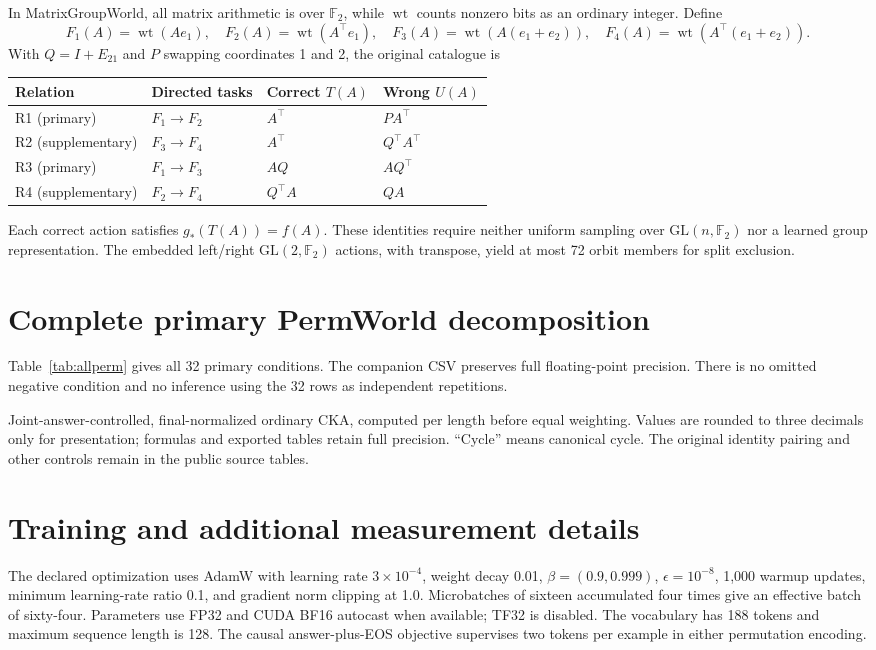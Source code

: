 \documentclass[10pt]{article}
\newcommand{\wt}{\operatorname{wt}}
\newcommand{\Ftwo}{\mathbb F_2}
\begin{document}
In MatrixGroupWorld, all matrix arithmetic is over $\Ftwo$, while $\wt$
counts nonzero bits as an ordinary integer. Define
\[
 F_1(A)=\wt(Ae_1),\quad F_2(A)=\wt(A^\top e_1),\quad
 F_3(A)=\wt(A(e_1+e_2)),\quad F_4(A)=\wt(A^\top(e_1+e_2)).
\]
With $Q=I+E_{21}$ and $P$ swapping coordinates 1 and 2, the original
catalogue is
\begin{center}\small
\begin{tabular}{llll}
\toprule
Relation & Directed tasks & Correct $T(A)$ & Wrong $U(A)$\\
\midrule
R1 (primary) & $F_1\to F_2$ & $A^\top$ & $PA^\top$\\
R2 (supplementary) & $F_3\to F_4$ & $A^\top$ & $Q^\top A^\top$\\
R3 (primary) & $F_1\to F_3$ & $AQ$ & $AQ^\top$\\
R4 (supplementary) & $F_2\to F_4$ & $Q^\top A$ & $QA$\\
\bottomrule
\end{tabular}
\end{center}
Each correct action satisfies $g_*(T(A))=f(A)$. These identities require
neither uniform sampling over $\mathrm{GL}(n,\Ftwo)$ nor a learned group
representation. The embedded left/right $\mathrm{GL}(2,\Ftwo)$ actions,
with transpose, yield at most 72 orbit members for split exclusion.

\section{Complete primary PermWorld decomposition}
\label{app:fullperm}
Table~\ref{tab:allperm} gives all 32 primary conditions. The companion CSV
preserves full floating-point precision. There is no omitted negative
condition and no inference using the 32 rows as independent repetitions.

\begin{table}[h]
\centering\scriptsize
\setlength{\tabcolsep}{3.0pt}

\caption{Joint-answer-controlled, final-normalized ordinary CKA, computed
per length before equal weighting. Values are rounded to three decimals
only for presentation; formulas and exported tables retain full precision.
``Cycle'' means canonical cycle. The original identity pairing and other
controls remain in the public source tables.}
\label{tab:allperm}
\end{table}

\section{Training and additional measurement details}
\label{app:training}
The declared optimization uses AdamW with learning rate $3\times10^{-4}$,
weight decay 0.01, $\beta=(0.9,0.999)$, $\epsilon=10^{-8}$,
1,000 warmup updates, minimum learning-rate ratio 0.1, and gradient norm
clipping at 1.0. Microbatches of sixteen accumulated four times give an
effective batch of sixty-four. Parameters use FP32 and CUDA BF16 autocast
when available; TF32 is disabled. The vocabulary has 188 tokens and maximum
sequence length is 128. The causal answer-plus-EOS objective supervises two
tokens per example in either permutation encoding.
\end{document}
